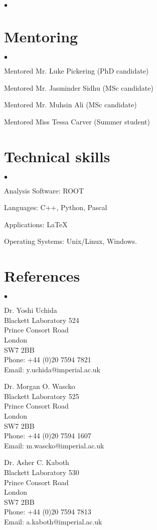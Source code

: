 \documentclass[margin,line]{res}
\newenvironment{list2}{
  \begin{list}{$\bullet$}{%
      \setlength{\itemsep}{0in}
      \setlength{\parsep}{0in} \setlength{\parskip}{0in}
      \setlength{\topsep}{0in} \setlength{\partopsep}{0in} 
      \setlength{\leftmargin}{0.2in}}}{\end{list}}
\begin{document}
\begin{resume}
\begin{list2}
\end{list2}

\section{\sc Mentoring }
\begin{list2}
\item Mentored Mr. Luke Pickering (PhD candidate)
\item Mentored Mr. Jasminder Sidhu (MSc candidate)
\item Mentored Mr. Muhsin Ali (MSc candidate)
\item Mentored Miss Tessa Carver (Summer student)


\end{list2}


\section{\sc Technical skills} 
\begin{list2}
\item Analysis Software: ROOT
\item Languages: C++, Python, Pascal
\item Applications:  \LaTeX
\item Operating Systems:  Unix/Linux, Windows.


\end{list2}


\newpage
\section{\sc References}
\begin{list2}
\item Dr. Yoshi Uchida\\ Blackett Laboratory 524\\Prince Consort Road\\London\\SW7 2BB\\Phone: +44 (0)20 7594 7821\\Email: y.uchida@imperial.ac.uk\\
\item Dr. Morgan O. Wascko\\ Blackett Laboratory 525\\Prince Consort Road\\London\\SW7 2BB\\Phone: +44 (0)20 7594 1607\\Email: m.wascko@imperial.ac.uk\\
\item Dr. Asher C. Kaboth\\ Blackett Laboratory 530\\Prince Consort Road\\London\\SW7 2BB\\Phone: +44 (0)20 7594 7813\\Email: a.kaboth@imperial.ac.uk\\




\end{list2}
\end{resume}
\end{document}
